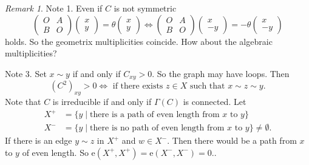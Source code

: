 \documentclass[
]{book}
\theoremstyle{definition}
\theoremstyle{definition}
\theoremstyle{definition}
\theoremstyle{definition}
\theoremstyle{remark}
\newtheorem*{remark}{Remark}
\begin{document}
\begin{remark}
Note 1. Even if \(C\) is not symmetric
\[\begin{pmatrix} O & A \\ B & O \end{pmatrix} \begin{pmatrix}x\\y\end{pmatrix} = \theta \begin{pmatrix}x\\y\end{pmatrix}\Leftrightarrow \begin{pmatrix} O & A \\ B & O \end{pmatrix} \begin{pmatrix}x\\-y\end{pmatrix} = -\theta \begin{pmatrix}x\\-y\end{pmatrix}\]
holds. So the geometrix multiplicities coincide. How about the algebraic multiplicities?

Note 3. Set \(x \sim y\) if and only if \(C_{xy}>0\). So the graph may have loops. Then
\[(C^2)_{xy} > 0 \Leftrightarrow \textrm{ if there exists } z\in X \textrm{ such that } x\sim z \sim y.\]
Note that \(C\) is irreducible if and only if \(\Gamma(C)\) is connected. Let
\begin{align}
X^+ & = \{y\mid \textrm{there is a path of even length from }x \textrm{ to }y\}\\
X^- & = \{y\mid \textrm{there is no path of even length from }x \textrm{ to }y\} \neq \emptyset.
\end{align}
If there is an edge \(y\sim z\) in \(X^+\) and \(w\in X^-\). Then there would be a path from \(x\) to \(y\) of even length.
So \(\mathrm{e}(X^+, X^+) = \mathrm{e}(X^-, X^-) = 0.\).
\end{remark}
\end{document}
